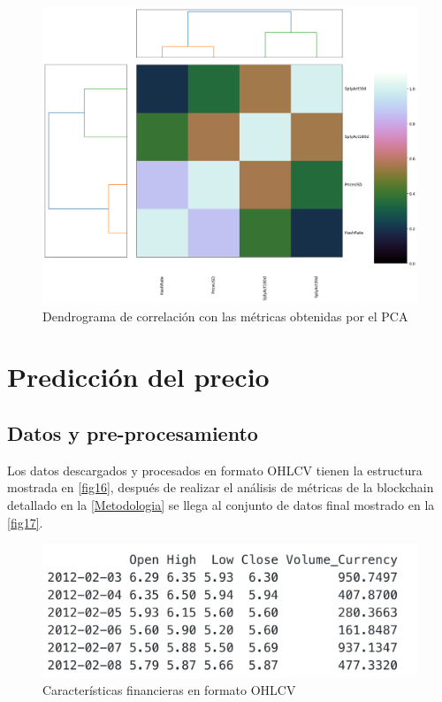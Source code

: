 \begin{figure}
	\centering
	\includegraphics[scale=0.3]{Chapter5/dendo.png}
	\caption{Dendrograma de correlación con las métricas obtenidas por el PCA}
	\label{fig15}
\end{figure}

\section{Predicción del precio}

\subsection{Datos y pre-procesamiento}
Los datos descargados y procesados en formato OHLCV tienen la estructura mostrada en \autoref{fig16}, después de realizar el análisis de métricas de la blockchain detallado en la \autoref{Metodologia} se llega al conjunto de datos final mostrado en la \autoref{fig17}.

\begin{figure}[h!]
	\centering
	\includegraphics[scale=0.5]{Chapter5/ohlcv.png}
	\caption{Características financieras en formato OHLCV}
	\label{fig16}
\end{figure}

